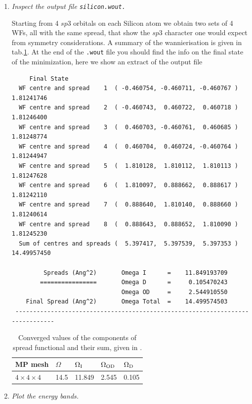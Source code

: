 \begin{enumerate}
	\item {\it Inspect the output file \tt{silicon.wout}.}

	Starting from 4 $sp3$ orbitals on each Silicon atom we obtain two sets of 4 WFs, all with the same spread, that show the $sp3$ character one would expect from symmetry considerations. A summary of the wannierisation is given in tab.\ref{tab3.1}. At the end of the {\tt .wout} file you should find the info on the final state of the minimization, here we show an extract of the output file
	\begin{tcolorbox}[sharp corners,boxrule=0.5pt]
	{\small
	\begin{verbatim}
	 Final State
  WF centre and spread    1  ( -0.460754, -0.460711, -0.460767 )     1.81241746
  WF centre and spread    2  ( -0.460743,  0.460722,  0.460718 )     1.81246400
  WF centre and spread    3  (  0.460703, -0.460761,  0.460685 )     1.81248774
  WF centre and spread    4  (  0.460704,  0.460724, -0.460764 )     1.81244947
  WF centre and spread    5  (  1.810128,  1.810112,  1.810113 )     1.81247628
  WF centre and spread    6  (  1.810097,  0.888662,  0.888617 )     1.81242110
  WF centre and spread    7  (  0.888640,  1.810140,  0.888660 )     1.81240614
  WF centre and spread    8  (  0.888643,  0.888652,  1.810090 )     1.81245230
  Sum of centres and spreads (  5.397417,  5.397539,  5.397353 )    14.49957450

         Spreads (Ang^2)       Omega I      =    11.849193709
        ================       Omega D      =     0.105470243
                               Omega OD     =     2.544910550
    Final Spread (Ang^2)       Omega Total  =    14.499574503
 ------------------------------------------------------------------------------
	\end{verbatim}
	}
	\end{tcolorbox}
	\begin{table}[b!]
	\centering
        \caption{Converged values of the components of spread functional and their sum, given in \angsqd{}.}
	\label{tab3.1}
	\begin{tabular}{@{} lllll @{}}\toprule[1.5pt]
	MP mesh & $\Omega$ & $\Omega\tinysub{I}$ & $\Omega\tinysub{OD}$ & $\Omega\tinysub{D}$ \\\midrule
	$4\times4\times4$ & 14.5 & 11.849 & 2.545 & 0.105 \\\bottomrule[1pt]
	\end{tabular}
	\end{table}
	\item {\it Plot the energy bands.}


\end{enumerate}
